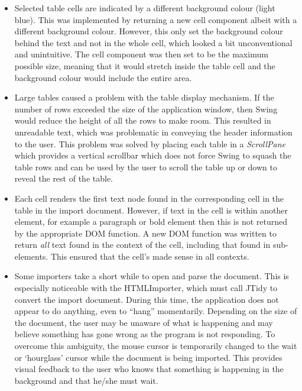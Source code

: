 \begin{itemize}

\item Selected table cells are indicated by a different background colour
(light blue). This was implemented by returning a new cell component albeit
with a different background colour. However, this only set the background
colour behind the text and not in the whole cell, which looked a bit
unconventional and unintuitive. The cell component was then set to be the
maximum possible size, meaning that it would stretch inside the table cell
and the background colour would include the entire area.

\item Large tables caused a problem with the table display mechanism. If the
number of rows exceeded the size of the application window, then Swing would
reduce the height of all the rows to make room. This resulted in unreadable
text, which was problematic in conveying the header information to the user.
This problem was solved by placing each table in a \emph{ScrollPane} which
provides a vertical scrollbar which does not force Swing to squash the table
rows and can be used by the user to scroll the table up or down to reveal
the rest of the table.

\item Each cell renders the first text node found in the corresponding cell in
the table in the import document. However, if text in the cell is within
another element, for example a paragraph or bold element then this is not
returned by the appropriate DOM function. A new DOM function was written to
return \emph{all} text found in the context of the cell, including that found
in sub-elements. This ensured that the cell's made sense in all contexts.

\item Some importers take a short while to open and parse the document. This is
especially noticeable with the HTMLImporter, which must call JTidy to convert
the import document. During this time, the application does not appear to do
anything, even to ``hang'' momentarily. Depending on the size of the document,
the user may be unaware of what is happening and may believe something has gone
wrong as the program is not responding. To overcome this ambiguity, the mouse
cursor is temporarily changed to the wait or `hourglass' cursor while the
document is being imported. This provides visual feedback to the user who knows
that something is happening in the background and that he/she must wait.


\end{itemize}
